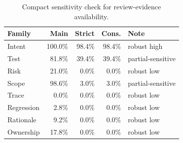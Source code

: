 \begin{table}[t]
\centering
\caption{Compact sensitivity check for review-evidence availability.}
\label{tab:availability-sensitivity-compact}
\footnotesize
\begin{tabular}{@{}lrrrl@{}}
\toprule
Family & Main & Strict & Cons. & Note \\
\midrule
Intent & 100.0\% & 98.4\% & 98.4\% & robust high \\
Test & 81.8\% & 39.4\% & 39.4\% & partial-sensitive \\
Risk & 21.0\% & 0.0\% & 0.0\% & robust low \\
Scope & 98.6\% & 3.0\% & 3.0\% & partial-sensitive \\
Trace & 0.0\% & 0.0\% & 0.0\% & robust low \\
Regression & 2.8\% & 0.0\% & 0.0\% & robust low \\
Rationale & 9.2\% & 0.0\% & 0.0\% & robust low \\
Ownership & 17.8\% & 0.0\% & 0.0\% & robust low \\
\bottomrule
\end{tabular}
\end{table}

